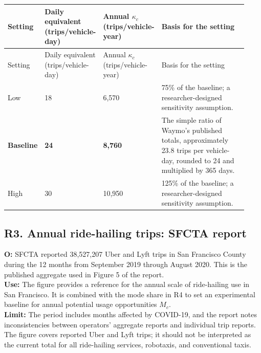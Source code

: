 \documentclass[10pt,a4paper]{article}
\begin{document}
\begingroup
\small
\setlength{\tabcolsep}{4pt}
\renewcommand{\arraystretch}{1.2}
\begin{longtable}{@{}
    P{0.12\linewidth}
    P{0.18\linewidth}
    P{0.20\linewidth}
    P{0.43\linewidth}
@{}}
\toprule
Setting
& Daily equivalent \newline (trips/vehicle-day)
& Annual $\kappa_c$ \newline (trips/vehicle-year)
& Basis for the setting \\
\midrule
\endfirsthead
\toprule
Setting
& Daily equivalent \newline (trips/vehicle-day)
& Annual $\kappa_c$ \newline (trips/vehicle-year)
& Basis for the setting \\
\midrule
\endhead

Low
& 18
& 6,570
& 75\% of the baseline; a researcher-designed sensitivity assumption. \\
\addlinespace

\textbf{Baseline}
& \textbf{24}
& \textbf{8,760}
& The simple ratio of Waymo's published totals, approximately 23.8 trips per vehicle-day, rounded to 24 and multiplied by 365 days. \\
\addlinespace

High
& 30
& 10,950
& 125\% of the baseline; a researcher-designed sensitivity assumption. \\
\bottomrule
\end{longtable}
\endgroup


\subsection*{\hypertarget{rationale-R3}{R3. Annual ride-hailing trips: SFCTA report}}

\noindent
\textbf{O:}
SFCTA reported 38,527,207 Uber and Lyft trips in San Francisco County during the 12 months from September 2019 through August 2020. This is the published aggregate used in Figure 5 of the report. \\
\textbf{Use:}
The figure provides a reference for the annual scale of ride-hailing use in San Francisco. It is combined with the mode share in R4 to set an experimental baseline for annual potential usage opportunities $M_c$. \\
\textbf{Limit:}
The period includes months affected by COVID-19, and the report notes inconsistencies between operators' aggregate reports and individual trip reports. The figure covers reported Uber and Lyft trips; it should not be interpreted as the current total for all ride-hailing services, robotaxis, and conventional taxis.
\end{document}
